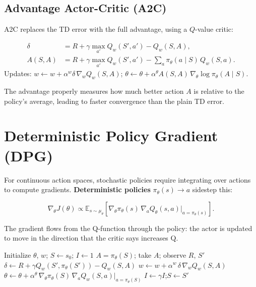 \documentclass[11pt,a4paper]{article}
\theoremstyle{definition}
\theoremstyle{plain}
\theoremstyle{remark}
\begin{document}
\subsection{Advantage Actor-Critic (A2C)}

A2C replaces the TD error with the full advantage, using a $Q$-value critic:

\begin{tcolorbox}[colback=blue!5!white,colframe=blue!75!black,title=\textbf{A2C Advantage Estimate}]
\begin{align*}
    \delta  &= R + \gamma \max_{a'} Q_w(S', a') - Q_w(S, A), \\
    A(S, A) &= R + \gamma \max_{a'} Q_w(S', a') - \sum_a \pi_\theta(a \mid S)\, Q_w(S, a).
\end{align*}
Updates: $w \leftarrow w + \alpha^w \delta\, \nabla_w Q_w(S, A)$; \quad $\theta \leftarrow \theta + \alpha^\theta A(S,A)\, \nabla_\theta \log \pi_\theta(A \mid S)$.
\end{tcolorbox}

The advantage properly measures how much better action $A$ is relative to the policy's average, leading to faster convergence than the plain TD error.

\section{Deterministic Policy Gradient (DPG)}

For continuous action spaces, stochastic policies require integrating over actions to compute gradients. \textbf{Deterministic policies} $\pi_\theta(s) \to a$ sidestep this:

\begin{tcolorbox}[colback=blue!5!white,colframe=blue!75!black,title=\textbf{Deterministic Policy Gradient Theorem (Silver et al., ICML 2014)}]
\[
    \nabla_\theta J(\theta) \propto \mathbb{E}_{s \sim \mu_\theta}\!\left[\nabla_\theta \pi_\theta(s)\, \nabla_a Q_\theta(s, a)\big|_{a = \pi_\theta(s)}\right].
\]
\end{tcolorbox}

The gradient flows from the Q-function through the policy: the actor is updated to move in the direction that the critic says increases Q.

\begin{algorithm}
\caption{Deterministic Policy Gradient (DPG)}
\begin{algorithmic}
\STATE Initialize $\theta$, $w$; $S \leftarrow s_0$; $I \leftarrow 1$
        \STATE $A = \pi_\theta(S)$; take $A$; observe $R$, $S'$
        \STATE $\delta \leftarrow R + \gamma Q_w(S', \pi_\theta(S')) - Q_w(S, A)$
        \STATE $w \leftarrow w + \alpha^w\, \delta\, \nabla_w Q_w(S, A)$
        \STATE $\theta \leftarrow \theta + \alpha^\theta\, \nabla_\theta \pi_\theta(S)\, \nabla_a Q_w(S, a)\big|_{a=\pi_\theta(S)}$
        \STATE $I \leftarrow \gamma I$;\quad $S \leftarrow S'$
    \ENDWHILE
\ENDWHILE
\end{algorithmic}
\end{algorithm}
\end{document}

